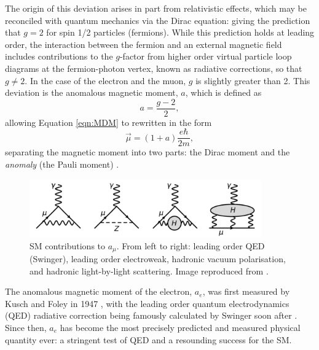 The origin of this deviation arises in part from relativistic effects, which may be reconciled with quantum mechanics via the Dirac equation: giving the prediction that $g=2$ for spin 1/2 particles (fermions). While this prediction holds at leading order, the interaction between the fermion and an external magnetic field includes contributions to the $g$-factor from higher order virtual particle loop diagrams at the fermion-photon vertex, known as radiative corrections, so that $g\neq2$. In the case of the electron and the muon, $g$ is slightly greater than 2. This deviation is the anomalous magnetic moment, $a$, which is defined as 
%
\begin{equation}
  a = \frac{g-2}{2},
  \label{eqn:AnaMagMom}
\end{equation}
% 
allowing Equation \ref{eqn:MDM} to rewritten in the form
%
\begin{equation}
  \vec{\mu} = (1+a)\frac{e\hbar}{2m},
  \label{eqn:MDM2}
\end{equation}
% 
separating the magnetic moment into two parts: the Dirac moment and the \textit{anomaly} (the Pauli moment) \cite{LeptonDipoleMoments}. 

\begin{figure}[b!]
\centering{}
\includegraphics[trim={0 0 0 0},clip,width=0.89\textwidth]{Images/Chapter1/FeynmanDiagrams.pdf}
\caption{SM contributions to $a_{\mu}$. From left to right: leading order QED (Swinger), leading order electroweak, hadronic vacuum polarisation, and hadronic light-by-light scattering. Image reproduced from \cite{SummaryRun1}.}
\label{fig:SMContributions}
\end{figure}

The anomalous magnetic moment of the electron, $a_{e}$, was first measured by Kusch and Foley in 1947 \cite{KuschAndFoley}, with the leading order quantum electrodynamics (QED) radiative correction being famously calculated by Swinger soon after \cite{Swinger}. Since then, $a_{e}$ has become the most precisely predicted \cite{ElectronAnomalyPrediction} and measured \cite{ElectronAnomalyMeasurement} physical quantity ever: a stringent test of QED and a resounding success for the SM.

